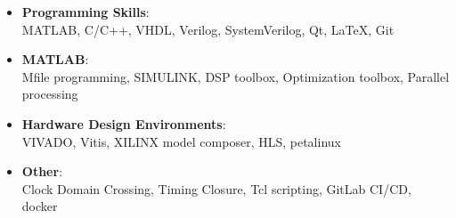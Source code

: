
\begin{itemize}
	\item \textbf{Programming Skills}:
	\\ MATLAB, C/C++, VHDL, Verilog, SystemVerilog, Qt, \LaTeX,   Git
	\item \textbf{MATLAB}:
 	\\ \quad Mfile programming, SIMULINK, DSP toolbox, Optimization toolbox, Parallel processing 
	\item \textbf{Hardware Design Environments}:
 	\\ \quad VIVADO, Vitis, XILINX model composer, HLS, petalinux
	\item \textbf{Other}:
	\\ \quad Clock Domain Crossing, Timing Closure, Tcl scripting, GitLab CI/CD, docker
\end{itemize}